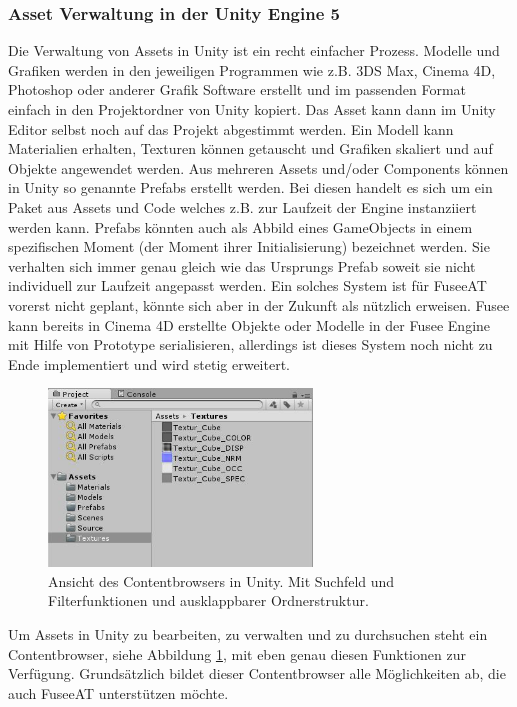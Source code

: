 \documentclass[pagesize, paper=a4, fontsize=12pt, titlepage=true, headings=small, headnosepline, abstractoff, liststotoc, nochapterprefix, plainheadsepline, twoside]{scrreprt}
\begin{document}
\subsubsection{Asset Verwaltung in der Unity Engine 5}
Die Verwaltung von Assets in Unity ist ein recht einfacher Prozess. Modelle und Grafiken werden in den jeweiligen Programmen wie z.B. 3DS Max, Cinema 4D, Photoshop oder anderer Grafik Software erstellt und im passenden Format einfach in den Projektordner von Unity kopiert. Das Asset kann dann im Unity Editor selbst noch auf das Projekt abgestimmt werden. Ein Modell kann Materialien erhalten, Texturen können getauscht und Grafiken skaliert und auf Objekte angewendet werden. Aus mehreren Assets und/oder Components können in Unity so genannte Prefabs erstellt werden. Bei diesen handelt es sich um ein Paket aus Assets und Code welches z.B. zur Laufzeit der Engine instanziiert werden kann. Prefabs könnten auch als Abbild eines GameObjects in einem spezifischen Moment (der Moment ihrer Initialisierung) bezeichnet werden. Sie verhalten sich immer genau gleich wie das Ursprungs Prefab soweit sie nicht individuell zur Laufzeit angepasst werden. Ein solches System ist für FuseeAT vorerst nicht geplant, könnte sich aber in der Zukunft als nützlich erweisen. Fusee kann bereits in Cinema 4D erstellte Objekte oder Modelle in der Fusee Engine mit Hilfe von Prototype serialisieren, allerdings ist dieses System noch nicht zu Ende implementiert und wird stetig erweitert.

\begin{figure}[ht]
	\centering
	\includegraphics[width=7cm]{Bilder/uContentbrowser.jpg}
	\caption{Ansicht des Contentbrowsers in Unity. Mit Suchfeld und Filterfunktionen und ausklappbarer Ordnerstruktur.}
	\label{UnityContentbrowser}
\end{figure}
Um Assets in Unity zu bearbeiten, zu verwalten und zu durchsuchen steht ein Contentbrowser, siehe Abbildung \ref{UnityContentbrowser}, mit eben genau diesen Funktionen zur Verfügung. Grundsätzlich bildet dieser Contentbrowser alle Möglichkeiten ab, die auch FuseeAT unterstützen möchte.
\end{document}

